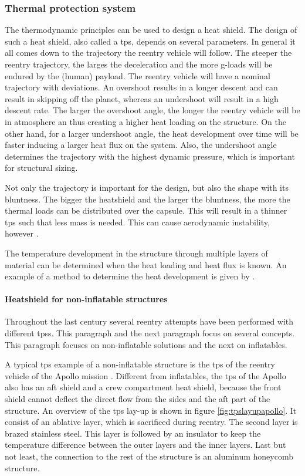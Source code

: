 \subsubsection{Thermal protection system}
The thermodynamic principles can be used to design a heat shield. The design of such a heat shield, also called a \acrfull{tps}, depends on several parameters. In general it all comes down to the trajectory the reentry vehicle will follow. The steeper the reentry trajectory, the larges the deceleration and the more g-loads will be endured by the (human) payload. The reentry vehicle will have a nominal trajectory with deviations. An overshoot results in a longer descent and can result in skipping off the planet, whereas an undershoot will result in a high descent rate. The larger the overshoot angle, the longer the reentry vehicle will be in atmosphere an thus creating a higher heat loading on the structure. On the other hand, for a larger undershoot angle, the heat development over time will be faster inducing a larger heat flux on the system. Also, the undershoot angle determines the trajectory with the highest dynamic pressure, which is important for structural sizing. 

Not only the trajectory is important for the design, but also the shape with its bluntness. The bigger the heatshield and the larger the bluntness, the more the  thermal loads can be distributed over the capsule. This will result in a thinner \gls{tps} such that less mass is needed. This can cause aerodynamic instability, however \cite{Smoot}.

The temperature development in the structure through multiple layers of material can be determined when the heat loading and heat flux is known. An example of a method to determine the heat development is given by \cite{Daryabeigi2002}.

\paragraph{Heatshield for non-inflatable structures}
Throughout the last century several reentry attempts have been performed with different \gls{tps}s. This paragraph and the next paragraph focus on several concepts. This paragraph focuses on non-inflatable solutions and the next on inflatables. 

A typical \gls{tps} example of a non-inflatable structure is the \gls{tps} of the reentry vehicle of the Apollo mission \cite{Pavlosky1974}. Different from inflatables, the \gls{tps} of the Apollo also has an aft shield and a crew compartment heat shield, because the front shield cannot deflect the direct flow from the sides and the aft part of the structure. An overview of the \gls{tps} lay-up is shown in figure \ref{fig:tpslayupapollo}. It consist of an ablative layer, which is sacrificed during reentry. The second layer is brazed stainless steel. This layer is followed by an insulator to keep the temperature difference between the outer layers and the inner layers. Last but not least, the connection to the rest of the structure is an aluminum honeycomb structure.

